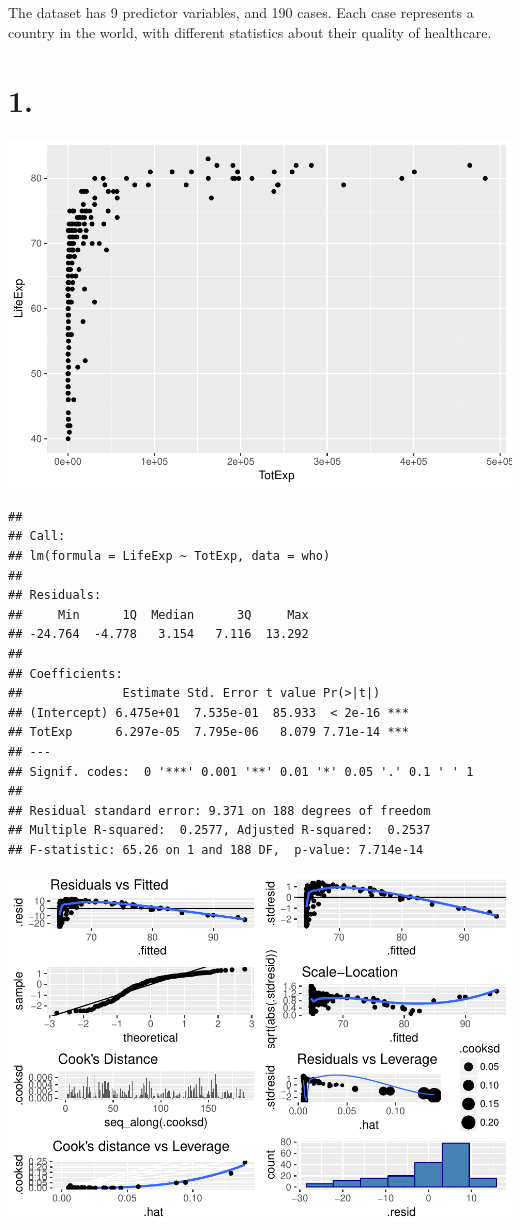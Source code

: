 \documentclass[]{article}
\begin{document}
The dataset has 9 predictor variables, and 190 cases. Each case
represents a country in the world, with different statistics about their
quality of healthcare.

\section{1.}\label{section}

\includegraphics{JSturm_Assignment_12_files/figure-latex/scatterplot-lifexp-totexp-1.pdf}

\begin{verbatim}
## 
## Call:
## lm(formula = LifeExp ~ TotExp, data = who)
## 
## Residuals:
##     Min      1Q  Median      3Q     Max 
## -24.764  -4.778   3.154   7.116  13.292 
## 
## Coefficients:
##              Estimate Std. Error t value Pr(>|t|)    
## (Intercept) 6.475e+01  7.535e-01  85.933  < 2e-16 ***
## TotExp      6.297e-05  7.795e-06   8.079 7.71e-14 ***
## ---
## Signif. codes:  0 '***' 0.001 '**' 0.01 '*' 0.05 '.' 0.1 ' ' 1
## 
## Residual standard error: 9.371 on 188 degrees of freedom
## Multiple R-squared:  0.2577, Adjusted R-squared:  0.2537 
## F-statistic: 65.26 on 1 and 188 DF,  p-value: 7.714e-14
\end{verbatim}

\includegraphics{JSturm_Assignment_12_files/figure-latex/simple-regression-1.pdf}
\end{document}
